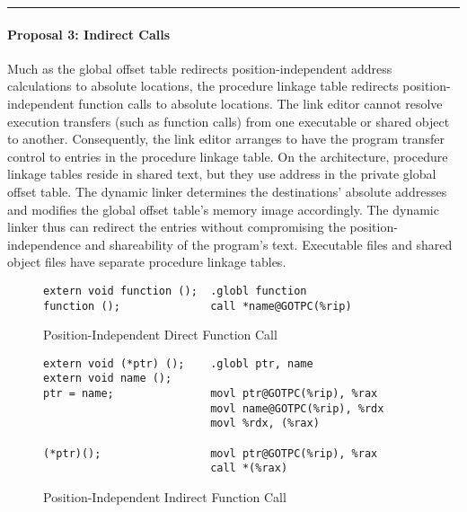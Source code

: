 \bigskip\hrule

\paragraph{Proposal 3: Indirect Calls}



Much as the global offset table redirects position-independent address
calculations to absolute locations, the procedure linkage table
redirects position-independent function calls to absolute locations.
The link editor cannot resolve execution transfers (such as function
calls) from one executable or shared object to another.  Consequently,
the link editor arranges to have the program transfer control to
entries in the procedure linkage table.  On the \xARCH architecture,
procedure linkage tables reside in shared text, but they use address
in the private global offset table.  The dynamic linker determines the
destinations' absolute addresses and modifies the global offset
table's memory image accordingly.  The dynamic linker thus can
redirect the entries without compromising the position-independence
and shareability of the program's text.  Executable files and shared
object files have separate procedure linkage tables.  

\begin{figure}[H]
\caption{Position-Independent Direct Function Call}
\begin{verbatim}
extern void function ();  .globl function
function ();              call *name@GOTPC(%rip)
\end{verbatim}
\end{figure}


\begin{figure}[H]
\caption{Position-Independent Indirect Function Call}
\begin{verbatim}
extern void (*ptr) ();    .globl ptr, name
extern void name ();
ptr = name;               movl ptr@GOTPC(%rip), %rax
                          movl name@GOTPC(%rip), %rdx
                          movl %rdx, (%rax)

(*ptr)();                 movl ptr@GOTPC(%rip), %rax
                          call *(%rax)
\end{verbatim}
\end{figure}



